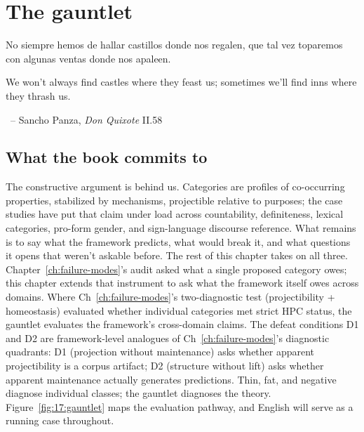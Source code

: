 \chapter{The gauntlet}
\label{ch:what-changes}

\epigraph{No siempre hemos de hallar castillos donde nos regalen, que tal vez toparemos con algunas ventas donde nos apaleen.

\smallskip

We won't always find castles where they feast us; sometimes we'll find inns where they thrash us.}{~-- Sancho Panza, \textit{Don Quixote} II.58}

\section{What the book commits to}
\label{sec:17:synthesis}

The constructive argument is behind us. Categories are profiles of co-occurring properties, stabilized by mechanisms, projectible relative to purposes; the case studies have put that claim under load across countability, definiteness, lexical categories, pro-form gender, and sign-language discourse reference. What remains is to say what the framework predicts, what would break it, and what questions it opens that weren't askable before. The rest of this chapter takes on all three. Chapter~\ref{ch:failure-modes}'s audit asked what a single proposed category owes; this chapter extends that instrument to ask what the framework itself owes across domains. Where Ch~\ref{ch:failure-modes}'s two-diagnostic test (projectibility + homeostasis) evaluated whether individual categories met strict HPC status, the gauntlet evaluates the framework's cross-domain claims. The defeat conditions D1 and D2 are framework-level analogues of Ch~\ref{ch:failure-modes}'s diagnostic quadrants: D1 (projection without maintenance) asks whether apparent projectibility is a corpus artifact; D2 (structure without lift) asks whether apparent maintenance actually generates predictions. Thin, fat, and negative diagnose individual classes; the gauntlet diagnoses the theory. Figure~\ref{fig:17:gauntlet} maps the evaluation pathway, and English  will serve as a running case throughout.

